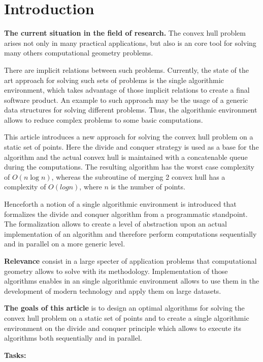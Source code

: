 \documentclass[conference]{IEEEtran}
\theoremstyle{plane}
\begin{document}
\section{Introduction}
\textbf{The current situation in the field of research.} The convex hull problem arises not only in many practical applications, but also is an core tool for solving many others computational geometry problems. 

There are implicit relations between such problems. Currently, the state of the art approach for solving such sets of problems is the single algorithmic environment, which takes advantage of those implicit relations to create a final software product. An example to such approach may be the usage of a generic data structures for solving different problems. Thus, the algorithmic environment allows to reduce complex problems to some basic computations.

This article introduces a new approach for solving the convex hull problem on a static set of points. Here the divide and conquer strategy is used as a base for the algorithm and the actual convex hull is maintained with a concatenable queue during the computations. The resulting algorithm has the worst case complexity of $O(n\log n)$, whereas the subroutine of merging 2 convex hull has a complexity of $O(log n)$, where $n$ is the number of points.

Henceforth a notion of a single algorithmic environment is introduced that formalizes the divide and conquer algorithm from a programmatic standpoint. The formalization allows to create a level of abstraction upon an actual implementation of an algorithm and therefore perform computations sequentially and in parallel on a more generic level.

\textbf{Relevance} consist in a large specter of application problems that computational geometry allows to solve with its methodology. Implementation of those algorithms enables in an single algorithmic environment allows to use them in the development of modern technology and apply them on large datasets.

\textbf{The goals of this article} is to design an optimal algorithms for solving the convex hull problem on a static set of points and to create a single algorithmic environment on the divide and conquer principle which allows to execute its algorithms both sequentially and in parallel.

\textbf{Tasks:}
\end{document}
